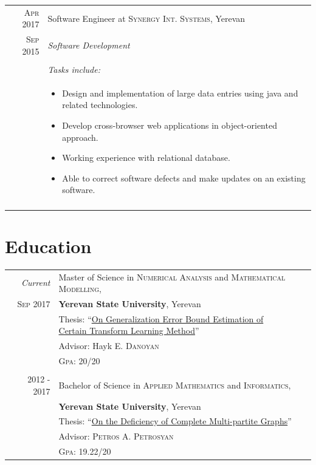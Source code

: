 \documentclass[a4paper,12pt]{article}
\begin{document}
\begin{tabular}{r|p{12.2cm}}
 \textsc{Apr 2017} & Software Engineer at \textsc{Synergy Int. Systems}, Yerevan \\\textsc{Sep 2015}&\emph{Software Development}  \\ \cline{2-2}& \\& \emph{Tasks include: }\\& \footnotesize{
 \begin{itemize}
  \item Design and implementation of large data entries using java and related technologies.
  \item Develop cross-browser web applications in object-oriented approach.
  \item Working experience with relational database.
  \item Able to correct software defects and make updates on an existing software.
\end{itemize}}\\
\multicolumn{2}{c}{} \\
\end{tabular}

\section{Education}
\begin{tabular}{rl}	
 \emph{Current} & Master of Science in \textsc{Numerical Analysis} and \textsc{Mathematical Modelling}, \\\textsc{Sep} 2017&\normalsize\textbf{Yerevan State University}, Yerevan\\

& Thesis: \makecell { ``\href{https://github.com/Gevorg-Minasyan/master-thesis}{On Generalization Error Bound Estimation of  }\\  \href{https://github.com/Gevorg-Minasyan/master-thesis}{Certain Transform Learning Method}'' } \\& \small Advisor: Hayk E. \textsc{Danoyan} \\
&\normalsize \textsc{Gpa}: 20/20%
\\&\\
\textsc{2012 - 2017} & Bachelor of Science in \textsc{Applied Mathematics} and \textsc{Informatics}, \\& \normalsize\textbf{Yerevan State University}, Yerevan\\
& Thesis: ``\href{https://arxiv.org/pdf/1912.01546.pdf}{On the Deficiency of Complete Multi-partite Graphs}'' \\& \small Advisor:   \textsc{Petros A. Petrosyan}\\
&\normalsize \textsc{Gpa}: 19.22/20%
\end{tabular}
\end{document}
